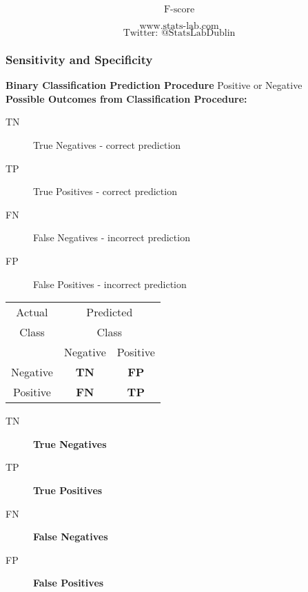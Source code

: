 \documentclass{beamer}
\begin{document}
\begin{frame}
\bigskip
{
\Huge
\[ \mbox{F-score} \]

}
{
\LARGE
\[ \mbox{www.stats-lab.com} \]
\[ \mbox{Twitter: @StatsLabDublin} \]
}
\end{frame}
\begin{frame}
\frametitle{Sensitivity and Specificity}
\Large
 \textbf{Binary Classification Prediction Procedure} Positive or Negative \\ \bigskip
 \textbf{Possible Outcomes from Classification Procedure:}\\ \bigskip
\begin{description}
\item[TN] True Negatives - correct prediction
\item[TP] True Positives - correct prediction
\item[FN] False Negatives - incorrect prediction
\item[FP] False Positives - incorrect prediction
\end{description}


\end{frame}

\begin{frame}

{
\LARGE
\centering
\begin{table}[!htbp]

\begin{tabular}{c | *2c }
Actual  & \multicolumn{2}{c}{Predicted}\\
Class  & \multicolumn{2}{c}{Class}\\
\midrule
{}   & Negative & Positive       \\
Negative  &  \textbf{TN} & \textbf{FP}  \\
Positive   &  \textbf{FN} & \textbf{TP}  \\
\end{tabular}
\end{table}
}
\begin{description}
\item[TN] \textbf{True Negatives} 
\item[TP] \textbf{True Positives} 
\item[FN] \textbf{False Negatives}
\item[FP] \textbf{False Positives} 
\end{description}

\end{frame}
\end{document}
